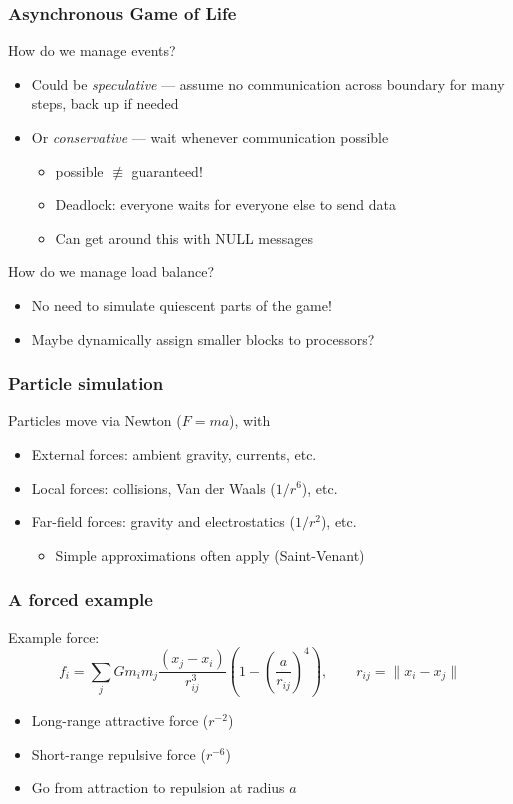 \documentclass{beamer}
\begin{document}
\begin{frame}
  \frametitle{Asynchronous Game of Life}

  How do we manage events?
  \begin{itemize}
  \item Could be {\em speculative} --- assume no communication across boundary
    for many steps, back up if needed
  \item Or {\em conservative} --- wait whenever communication possible
    \begin{itemize}
    \item possible $\not \equiv$ guaranteed!
    \item Deadlock: everyone waits for everyone else to send data
    \item Can get around this with NULL messages
    \end{itemize}
  \end{itemize}
  
  \vspace{3mm}
  How do we manage load balance?
  \begin{itemize}
  \item No need to simulate quiescent parts of the game!
  \item Maybe dynamically assign smaller blocks to processors?
  \end{itemize}

\end{frame}


\begin{frame}
  \frametitle{Particle simulation}

  Particles move via Newton ($F = ma$), with
  \begin{itemize}
  \item External forces: ambient gravity, currents, etc.
  \item Local forces: collisions, Van der Waals ($1/r^6$), etc.
  \item Far-field forces: gravity and electrostatics ($1/r^2$), etc.
    \begin{itemize}
    \item Simple approximations often apply (Saint-Venant)
    \end{itemize}
  \end{itemize}
\end{frame}


\begin{frame}
  \frametitle{A forced example}

  Example force:
  \[
    f_i = \sum_j Gm_i m_j
      \frac{(x_j-x_i)}{r_{ij}^3}
      \left(1 - \left(\frac{a}{r_{ij}}\right)^{4} \right), \qquad
      r_{ij} = \|x_i-x_j\|
  \]
  \begin{itemize}
  \item Long-range attractive force ($r^{-2}$)
  \item Short-range repulsive force ($r^{-6}$)
  \item Go from attraction to repulsion at radius $a$
  \end{itemize}

\end{frame}
\end{document}
